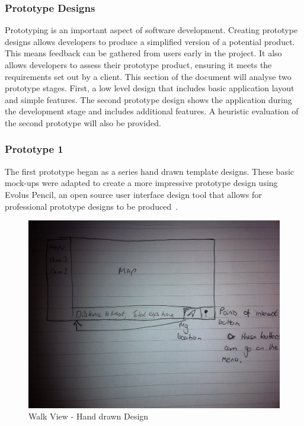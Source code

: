 \documentclass[11pt,a4paper]{article}
\begin{document}
\subsubsection{Prototype Designs}

Prototyping is an important aspect of software development. Creating prototype designs allows developers to produce a simplified version of a potential product. This means feedback can be gathered from users early in the project. It also allows developers to assess their prototype product, ensuring it meets the requirements set out by a client. This section of the document will analyse two prototype stages. First, a low level design that includes basic application layout and simple features. The second prototype design shows the application during the development stage and includes additional features. A heuristic evaluation of the second prototype will also be provided.

\subsubsection{Prototype 1}

The first prototype began as a series hand drawn template designs. These basic mock-ups were adapted to create a more impressive prototype design using Evolus Pencil, an open source user interface design tool that allows for professional prototype designs to be produced~\cite{pencil}.

\begin{figure}[H]
\begin{center}
\includegraphics[angle = 90, width=.8\linewidth]{./img/hand_drawn.jpg}
\caption{Walk View - Hand drawn Design}
\label{fig:handDrawn}
\end{center}
\end{figure}
\end{document}
